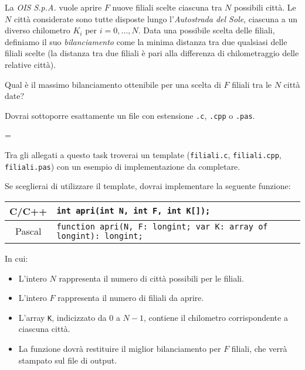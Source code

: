 \usepackage{xcolor}
\usepackage{afterpage}
\usepackage{pifont,mdframed}
\usepackage[bottom]{footmisc}

\makeatletter
\gdef\this@inputfilename{input.txt}
\gdef\this@outputfilename{output.txt}
\makeatother

\newcommand{\inputfile}{\texttt{input.txt}}
\newcommand{\outputfile}{\texttt{output.txt}}

\newenvironment{warning}
  {\par\begin{mdframed}[linewidth=2pt,linecolor=gray]%
    \begin{list}{}{\leftmargin=1cm
                   \labelwidth=\leftmargin}\item[\Large\ding{43}]}
  {\end{list}\end{mdframed}\par}

	La \emph{OIS S.p.A.} vuole aprire $F$ nuove filiali scelte ciascuna tra $N$ possibili citt\`a. Le $N$ citt\`a considerate sono tutte disposte lungo l'\emph{Autostrada del Sole}, ciascuna a un diverso chilometro $K_i$ per $i=0, \ldots, N$. Data una possibile scelta delle filiali, definiamo il suo \emph{bilanciamento} come la minima distanza tra due qualsiasi delle filiali scelte (la distanza tra due filiali \`e pari alla differenza di chilometraggio delle relative citt\`a).

	Qual \`e il massimo bilanciamento ottenibile per una scelta di $F$ filiali tra le $N$ citt\`a date?


\Implementation
Dovrai sottoporre esattamente un file con estensione \texttt{.c}, \texttt{.cpp} o \texttt{.pas}.

\begin{warning}
Tra gli allegati a questo task troverai un template (\texttt{filiali.c}, \texttt{filiali.cpp}, \texttt{filiali.pas}) con un esempio di implementazione da completare.
\end{warning}

Se sceglierai di utilizzare il template, dovrai implementare la seguente funzione:
\begin{center}\begin{tabularx}{\textwidth}{|c|X|}
\hline
C/C++  & \verb|int apri(int N, int F, int K[]);|\\
\hline
Pascal & \verb|function apri(N, F: longint; var K: array of longint): longint;|\\
\hline
\end{tabularx}\end{center}
In cui:
\begin{itemize}[nolistsep]
  \item L'intero $N$ rappresenta il numero di citt\`a possibili per le filiali.
  \item L'intero $F$ rappresenta il numero di filiali da aprire.
  \item L'array \texttt{K}, indicizzato da $0$ a $N-1$, contiene il chilometro corrispondente a ciascuna citt\`a.
  \item La funzione dovrà restituire il miglior bilanciamento per $F$ filiali, che verrà stampato sul file di output.
\end{itemize}

